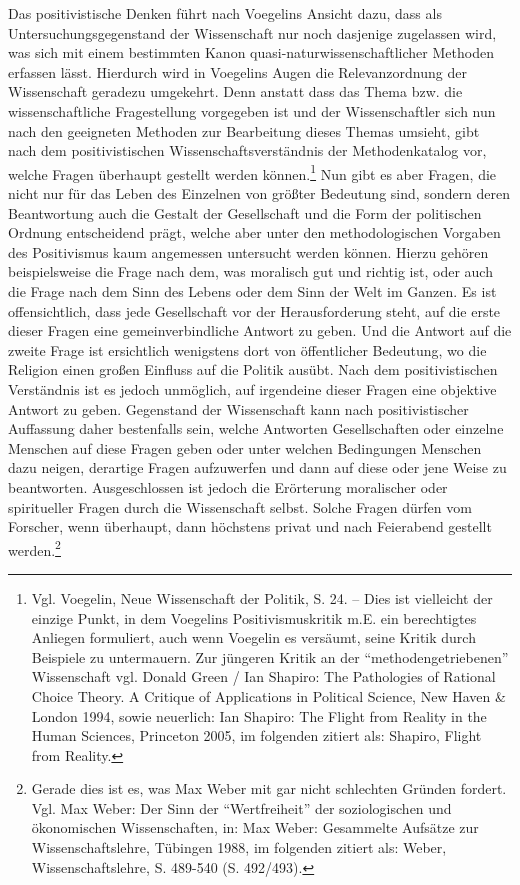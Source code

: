 Das positivistische Denken führt nach Voegelins Ansicht dazu, dass als
Untersuchungsgegenstand der Wissenschaft nur noch dasjenige zugelassen wird,
was sich mit einem bestimmten Kanon quasi-naturwissenschaftlicher Methoden
erfassen lässt. Hierdurch wird in Voegelins Augen die Relevanzordnung der
Wissenschaft geradezu umgekehrt. Denn anstatt dass das Thema bzw. die
wissenschaftliche Fragestellung vorgegeben ist und der Wissenschaftler sich
nun nach den geeigneten Methoden zur Bearbeitung dieses Themas umsieht, gibt
nach dem positivistischen Wissenschaftsverständnis der Methodenkatalog vor,
welche Fragen überhaupt gestellt werden können.\footnote{Vgl. Voegelin, Neue
  Wissenschaft der Politik, S. 24. -- Dies ist vielleicht der einzige Punkt,
  in dem Voegelins Positivismuskritik m.E. ein berechtigtes Anliegen
  formuliert, auch wenn Voegelin es versäumt, seine Kritik durch Beispiele zu
  untermauern. Zur jüngeren Kritik an der "`methodengetriebenen"' Wissenschaft
  vgl.  Donald Green / Ian Shapiro: The Pathologies of Rational Choice Theory.
  A Critique of Applications in Political Science, New Haven \& London 1994,
  sowie neuerlich: Ian Shapiro: The Flight from Reality in the Human Sciences,
  Princeton 2005, im folgenden zitiert als: Shapiro, Flight from Reality.} Nun
gibt es aber Fragen, die nicht nur für das Leben des Einzelnen von größter
Bedeutung sind, sondern deren Beantwortung auch die Gestalt der Gesellschaft
und die Form der politischen Ordnung entscheidend prägt, welche aber unter den
methodologischen Vorgaben des Positivismus kaum angemessen untersucht werden
können. Hierzu gehören beispielsweise die Frage nach dem, was moralisch gut
und richtig ist, oder auch die Frage nach dem Sinn des Lebens oder dem Sinn
der Welt im Ganzen. Es ist offensichtlich, dass jede Gesellschaft vor der
Herausforderung steht, auf die erste dieser Fragen eine gemeinverbindliche
Antwort zu geben. Und die Antwort auf die zweite Frage ist ersichtlich
wenigstens dort von öffentlicher Bedeutung, wo die Religion einen großen
Einfluss auf die Politik ausübt. Nach dem positivistischen Verständnis ist es
jedoch unmöglich, auf irgendeine dieser Fragen eine objektive Antwort zu
geben.  Gegenstand der Wissenschaft kann nach positivistischer Auf\/fassung
daher bestenfalls sein, welche Antworten Gesellschaften oder einzelne Menschen
auf diese Fragen geben oder unter welchen Bedingungen Menschen dazu neigen,
derartige Fragen aufzuwerfen und dann auf diese oder jene Weise zu
beantworten. Ausgeschlossen ist jedoch die Erörterung moralischer oder
spiritueller Fragen durch die Wissenschaft selbst.  Solche Fragen dürfen vom
Forscher, wenn überhaupt, dann höchstens privat und nach Feierabend gestellt
werden.\footnote{Gerade dies ist es, was Max Weber mit gar nicht schlechten
  Gründen fordert. Vgl. Max Weber: Der Sinn der "`Wertfreiheit"' der
  soziologischen und ökonomischen Wissenschaften, in: Max Weber: Gesammelte
  Aufsätze zur Wissenschaftslehre, Tübingen 1988, im folgenden zitiert als:
  Weber, Wissenschaftslehre, S. 489-540 (S. 492/493).}

